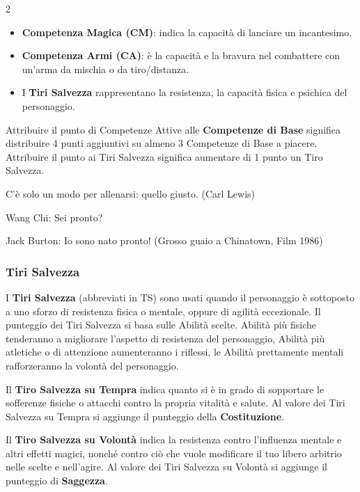 \begin{multicols}{2}
\begin{itemize}[leftmargin=*]
\item \textbf{Competenza Magica (CM)}:  indica la capacità di lanciare un incantesimo.

\item \textbf{Competenza Armi (CA)}:  è la capacità e la bravura nel combattere con un'arma da mischia o da tiro/distanza.

\item I \textbf{Tiri Salvezza} rappresentano la resistenza, la capacità fisica e psichica del personaggio.
\end{itemize}

Attribuire il punto di Competenze Attive alle \textbf{Competenze di Base} significa distribuire 4 punti aggiuntivi su almeno 3 Competenze di Base a piacere. Attribuire il punto ai Tiri Salvezza significa aumentare di 1 punto un Tiro Salvezza.

\medskip

\begin{enfasi}{C'è solo un modo per allenarsi: quello giusto. (Carl Lewis)
\medskip

Wang Chi: Sei pronto?

Jack Burton: Io sono nato pronto! (Grosso guaio a Chinatown, Film 1986)
}\end{enfasi}

\subsubsection{Tiri Salvezza}\label{tirisavellza}

I \textbf{Tiri Salvezza} (abbreviati in TS) sono usati quando il personaggio è sottoposto a uno sforzo di resistenza fisica o mentale, oppure di agilità eccezionale. Il punteggio dei Tiri Salvezza si basa sulle Abilità scelte. Abilità più fisiche tenderanno a migliorare l'aspetto di resistenza del personaggio, Abilità più atletiche o di attenzione aumenteranno i riflessi, le Abilità prettamente mentali rafforzeranno la volontà del personaggio.

Il \textbf{Tiro Salvezza su Tempra} indica quanto si è in grado di sopportare le sofferenze fisiche o attacchi contro la propria vitalità e salute. Al valore dei Tiri Salvezza su Tempra si aggiunge il punteggio della \textbf{Costituzione}.

Il \textbf{Tiro Salvezza su Volontà} indica la resistenza contro l'influenza mentale e altri effetti magici, nonché contro ciò che vuole modificare il tuo libero arbitrio nelle scelte e nell'agire. Al valore dei Tiri Salvezza su Volontà si aggiunge il punteggio di \textbf{Saggezza}.


\end{multicols}
